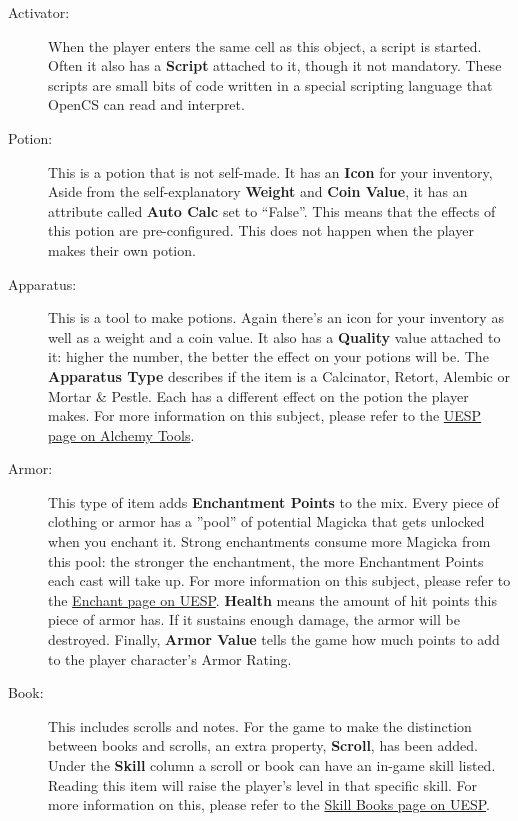 \begin{description}
 \item[Activator:] When the player enters the same cell as this object, a script is started. Often it also has a \textbf{Script} attached to it, though it not mandatory. These scripts are small bits of code written in a special scripting language that OpenCS can read and interpret.
 \item[Potion:] This is a potion that is not self-made. It has an \textbf{Icon} for your inventory, Aside from the self-explanatory \textbf{Weight} and \textbf{Coin Value}, it has an attribute called \textbf{Auto Calc} set to ``False''. This means that the effects of this potion are pre-configured. This does not happen when the player makes their own potion.
 \item[Apparatus:] This is a tool to make potions. Again there's an icon for your inventory as well as a weight and a coin value. It also has a \textbf{Quality} value attached to it: higher the number, the better the effect on your potions will be. The \textbf{Apparatus Type} describes if the item is a Calcinator, Retort, Alembic or Mortar \& Pestle. Each has a different effect on the potion the player makes. For more information on this subject, please refer to the \href{http://www.uesp.net/wiki/Morrowind:Alchemy#Tools}{UESP page on Alchemy Tools}.
 \item[Armor:] This type of item adds \textbf{Enchantment Points} to the mix. Every piece of clothing or armor has a ''pool'' of potential Magicka that gets unlocked when you enchant it. Strong enchantments consume more Magicka from this pool: the stronger the enchantment, the more Enchantment Points each cast will take up. For more information on this subject, please refer to the \href{http://www.uesp.net/wiki/Morrowind:Enchant}{Enchant page on UESP}. \textbf{Health} means the amount of hit points this piece of armor has. If it sustains enough damage, the armor will be destroyed. Finally, \textbf{Armor Value} tells the game how much points to add to the player character's Armor Rating.
 \item[Book:] This includes scrolls and notes. For the game to make the distinction between books and scrolls, an extra property, \textbf{Scroll}, has been added. Under the \textbf{Skill} column a scroll or book can have an in-game skill listed. Reading this item will raise the player's level in that specific skill. For more information on this, please refer to the \href{http://www.uesp.net/wiki/Morrowind:Skill_Books}{Skill Books page on UESP}.

\end{description}
